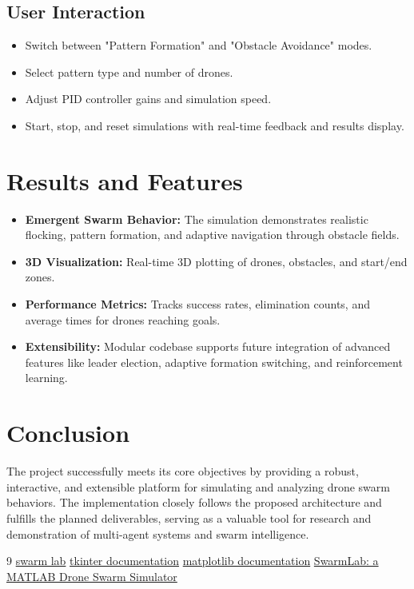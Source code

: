 \documentclass[11pt]{article}
\begin{document}
\subsection{User Interaction}
\begin{itemize}
    \item Switch between "Pattern Formation" and "Obstacle Avoidance" modes.
    \item Select pattern type and number of drones.
    \item Adjust PID controller gains and simulation speed.
    \item Start, stop, and reset simulations with real-time feedback and results display.
\end{itemize}

\section{Results and Features}
\begin{itemize}
    \item \textbf{Emergent Swarm Behavior:} The simulation demonstrates realistic flocking, pattern formation, and adaptive navigation through obstacle fields.
    \item \textbf{3D Visualization:} Real-time 3D plotting of drones, obstacles, and start/end zones.
    \item \textbf{Performance Metrics:} Tracks success rates, elimination counts, and average times for drones reaching goals.
    \item \textbf{Extensibility:} Modular codebase supports future integration of advanced features like leader election, adaptive formation switching, and reinforcement learning.
\end{itemize}

\section{Conclusion}
The project successfully meets its core objectives by providing a robust, interactive, and extensible platform for simulating and analyzing drone swarm behaviors. The implementation closely follows the proposed architecture and fulfills the planned deliverables, serving as a valuable tool for research and demonstration of multi-agent systems and swarm intelligence.

\begin{thebibliography}{9}
\href{https://github.com/lis-epfl/swarmlab}{swarm lab}
\href{https://docs.python.org/3/library/tkinter.html}{tkinter documentation}
\href{https://matplotlib.org/stable/index.html}{matplotlib documentation}
\href{https://arxiv.org/pdf/2005.02769}{SwarmLab: a MATLAB Drone Swarm Simulator}
\end{thebibliography}
\newpage
\appendix
\end{document}

